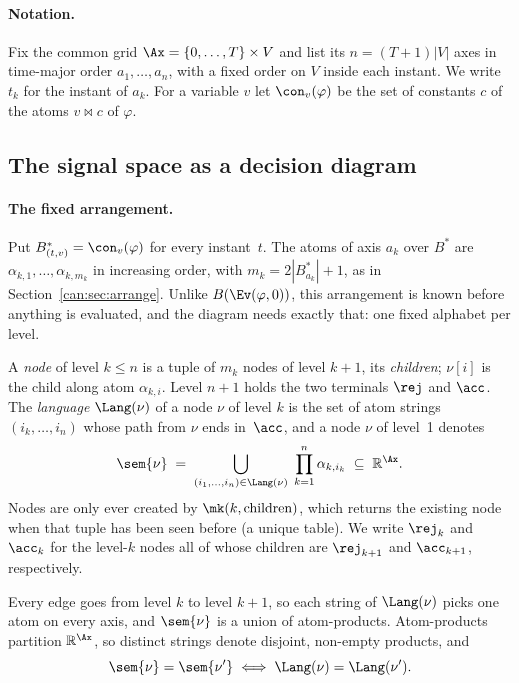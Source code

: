 \paragraph{Notation.}
Fix the common grid $\Ax = \{0,\dots,T\}\times V$ and list its $n = (T+1)|V|$
axes in time-major order $a_1,\dots,a_n$, with a fixed order on $V$ inside each
instant. We write $t_k$ for the instant of $a_k$. For a variable $v$ let
$\con_v(\varphi)$ be the set of constants $c$ of the atoms $v \bowtie c$ of
$\varphi$.

\subsection{The signal space as a decision diagram}\label{sec:method-diagram}

\paragraph{The fixed arrangement.}
Put $B^*_{(t,v)} = \con_v(\varphi)$ for every instant~$t$. The atoms of axis
$a_k$ over $B^*$ are $\alpha_{k,1},\dots,\alpha_{k,m_k}$ in increasing order,
with $m_k = 2|B^*_{a_k}|+1$, as in Section~\ref{can:sec:arrange}. Unlike $B(\Ev(\varphi,0))$,
this arrangement is known before anything is evaluated, and the diagram needs
exactly that: one fixed alphabet per level.

\begin{definition}\label{def:diagram}
A \emph{node} of level $k\le n$ is a tuple of $m_k$ nodes of level $k+1$, its
\emph{children}; $\nu[i]$ is the child along atom $\alpha_{k,i}$. Level $n+1$
holds the two terminals $\rej$ and $\acc$. The \emph{language} $\Lang(\nu)$ of
a node $\nu$ of level $k$ is the set of atom strings $(i_k,\dots,i_n)$ whose
path from $\nu$ ends in~$\acc$, and a node $\nu$ of level~1 denotes
\[
  \sem{\nu} \;=\; \bigcup_{(i_1,\dots,i_n)\in\Lang(\nu)} \;\prod_{k=1}^{n}\alpha_{k,i_k}
  \;\subseteq\; \mathbb{R}^{\Ax}.
\]
Nodes are only ever created by $\mk(k,\text{children})$, which returns the
existing node when that tuple has been seen before (a unique table). We write
$\rej_k$ and $\acc_k$ for the level-$k$ nodes all of whose children are
$\rej_{k+1}$ and $\acc_{k+1}$, respectively.
\end{definition}

Every edge goes from level $k$ to level $k+1$, so each string of
$\Lang(\nu)$ picks one atom on every axis, and $\sem{\nu}$ is a union of
atom-products. Atom-products partition $\mathbb{R}^{\Ax}$, so distinct strings
denote disjoint, non-empty products, and
\begin{equation}\label{eq:lang-sem}
  \sem{\nu}=\sem{\nu'} \iff \Lang(\nu)=\Lang(\nu').
\end{equation}

